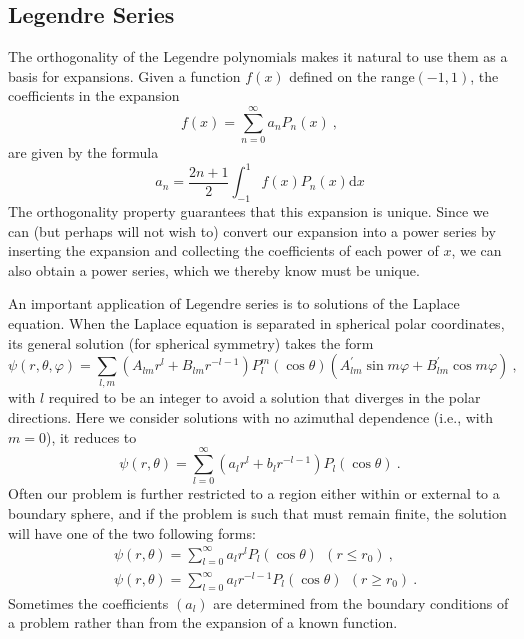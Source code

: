 \documentclass[12pt,a4paper]{article}
\newcommand{\dif}{\mathrm{d}}
\begin{document}
\subsection{Legendre Series}
The orthogonality of the Legendre polynomials makes it natural to use them as a basis for expansions. Given a function $f(x)$ defined on the range$(-1, 1)$, the coefficients in the expansion
\begin{equation}
f(x) = \sum_{n=0}^\infty a_n P_n(x) ~,
\end{equation}
are given by the formula
\begin{equation}
a_n = \dfrac{2n+1}{2} \int_{-1}^1 f(x) P_n(x) \dif x
\end{equation}
The orthogonality property guarantees that this expansion is unique. Since we can (but perhaps will not wish to) convert our expansion into a power series by inserting the expansion and collecting the coefficients of each power of $x$, we can also obtain a power series, which we thereby know must be unique.


An important application of Legendre series is to solutions of the Laplace equation. When the Laplace equation is separated in spherical polar coordinates, its general solution (for spherical symmetry) takes the form
\begin{equation}
\psi(r, \theta, \varphi) = \sum_{l, m} (A_{lm} r^l +B_{lm} r^{-l-1})P_l^m (\cos \theta) (A^\prime_{lm} \sin m \varphi + B^\prime_{lm} \cos m \varphi) ~,
\end{equation}
with $l$ required to be an integer to avoid a solution that diverges in the polar directions. Here we consider solutions with no azimuthal dependence (i.e., with $m = 0$), it reduces to 
\begin{equation}
\psi(r, \theta) = \sum_{l = 0}^\infty (a_{l} r^l +b_{l} r^{-l-1})P_l (\cos \theta) ~.
\end{equation}
Often our problem is further restricted to a region either within or external to a boundary sphere, and if the problem is such that must remain finite, the solution will have one of the two following forms:
\begin{align}
& \psi(r, \theta) = \sum_{l = 0}^\infty a_{l} r^l P_l (\cos \theta) ~~ (r \leqslant r_0) ~,\\
& \psi(r, \theta) = \sum_{l = 0}^\infty a_{l} r^{-l-1} P_l (\cos \theta) ~~ (r \geqslant r_0) ~.
\end{align}
Sometimes the coefficients $(a_l)$ are determined from the boundary conditions of a problem rather than from the expansion of a known function.
\end{document}
